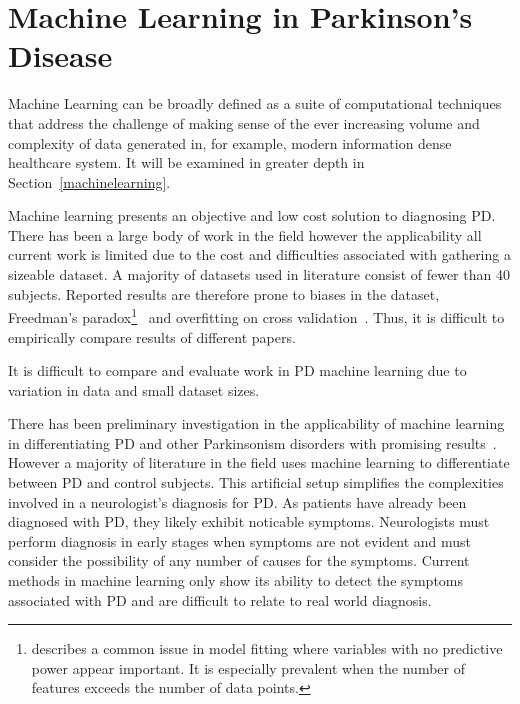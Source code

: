 \documentclass[12pt, twoside]{book}
\renewcommand\emph[1]{\textit{\color{USred}{#1}}}
\begin{document}
\section{Machine Learning in Parkinson's Disease}
Machine Learning can be broadly defined as a suite of computational techniques that address the challenge of making sense of the ever increasing volume and complexity of data generated in, for example, modern information dense healthcare system. It will be examined in greater depth in Section~\ref{machinelearning}.

Machine learning presents an objective and low cost solution to diagnosing PD. There has been a large body of work in the field however the applicability all current work is limited due to the cost and difficulties associated with gathering a sizeable dataset. A majority of datasets used in literature consist of fewer than 40 subjects. Reported results are therefore prone to biases in the dataset, Freedman's paradox\footnote{\emph{Freedman's paradox} describes a common issue in model fitting where variables with no predictive power appear important. It is especially prevalent when the number of features exceeds the number of data points.}~\cite{freedmanparadox} and overfitting on cross validation~\cite{overfittingcv}. Thus, it is difficult to empirically compare results of different papers.


\begin{highlight}
It is difficult to compare and evaluate work in PD machine learning due to variation in data and small dataset sizes.
\end{highlight}

There has been preliminary investigation in the applicability of machine learning in differentiating PD and other Parkinsonism disorders with promising results~\cite{esser2011assessment, PDessentialtremordifferentiation}. However a majority of literature in the field uses machine learning to differentiate between PD and control subjects. This artificial setup simplifies the complexities involved in a neurologist's diagnosis for PD. As patients have already been diagnosed with PD, they likely exhibit noticable symptoms. Neurologists must perform diagnosis in early stages when symptoms are not evident and must consider the possibility of any number of causes for the symptoms. Current methods in machine learning only show its ability to detect the symptoms associated with PD and are difficult to relate to real world diagnosis. 
\end{document}
